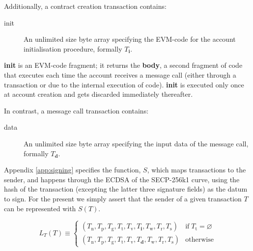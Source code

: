 \documentclass[9pt,oneside]{amsart}
\begin{document}
\begin{multicols}{2}
Additionally, a contract creation transaction contains:

\begin{description}
\item[init] An unlimited size byte array specifying the EVM-code for the account initialisation procedure, formally $T_{\mathbf{i}}$.
\end{description}

\textbf{init} is an EVM-code fragment; it returns the \textbf{body}, a second fragment of code that executes each time the account receives a message call (either through a transaction or due to the internal execution of code). \textbf{init} is executed only once at account creation and gets discarded immediately thereafter.

In contrast, a message call transaction contains:

\begin{description}
\item[data] An unlimited size byte array specifying the input data of the message call, formally $T_{\mathbf{d}}$.
\end{description}

Appendix \ref{app:signing} specifies the function, $S$, which maps transactions to the sender, and happens through the ECDSA of the SECP-256k1 curve, using the hash of the transaction (excepting the latter three signature fields) as the datum to sign. For the present we simply assert that the sender of a given transaction $T$ can be represented with $S(T)$.

\begin{equation}
L_{T}(T) \equiv \begin{cases}
(T_{\mathrm{n}}, T_{\mathrm{p}}, T_{\mathrm{g}}, T_{\mathrm{t}}, T_{\mathrm{v}}, T_{\mathbf{i}}, T_{\mathrm{w}}, T_{\mathrm{r}}, T_{\mathrm{s}}) & \text{if} \; T_{\mathrm{t}} = \varnothing\\
(T_{\mathrm{n}}, T_{\mathrm{p}}, T_{\mathrm{g}}, T_{\mathrm{t}}, T_{\mathrm{v}}, T_{\mathbf{d}}, T_{\mathrm{w}}, T_{\mathrm{r}}, T_{\mathrm{s}}) & \text{otherwise}
\end{cases}
\end{equation}


\end{multicols}
\end{document}
